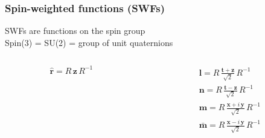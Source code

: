 \documentclass[12pt,xcolor={dvipsnames}]{beamer}
\renewcommand{\vec}{\bm}
\renewcommand{\vec}[1]{\boldsymbol{#1}}
\begin{document}
\begin{frame}
  \frametitle{Spin-weighted functions (SWFs)}
  \begin{center}
    SWFs are functions on the spin group \\[10pt]
    Spin(3) = SU(2) = group of unit quaternions
  \end{center}
  \begin{columns}[T]
    \begin{column}{.3\textwidth}
      \begin{minipage}[c][.6\textheight][c]{1.8\textwidth}
        \begin{equation*}
          \hat{\vec{r}} = R\, \vec{z}\, R^{-1}
        \end{equation*}
      \end{minipage}
    \end{column}
    \begin{column}{.7\textwidth}
      \begin{gather*}
        \vec{l} = R\, \frac{\vec{t} + \vec{z}} {\sqrt{2}}\, R^{-1} \\
        \vec{n} = R\, \frac{\vec{t} - \vec{z}} {\sqrt{2}}\, R^{-1} \\
        \vec{m} = R\, \frac{\vec{x} + i\, \vec{y}} {\sqrt{2}}\, R^{-1}
        \\
        \bar{\vec{m}} = R\, \frac{\vec{x} - i\, \vec{y}} {\sqrt{2}}\,
        R^{-1}
      \end{gather*}
    \end{column}
  \end{columns}
\end{frame}




\end{document}
